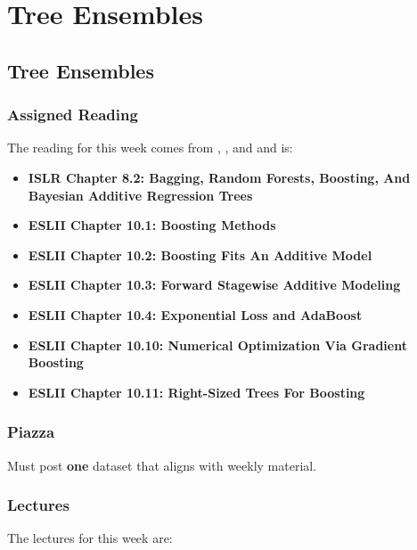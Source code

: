 \clearpage

\renewcommand{\ChapTitle}{Tree Ensembles}
\renewcommand{\SectionTitle}{Tree Ensembles}

\chapter{\ChapTitle}
\section{\SectionTitle}

\subsection{Assigned Reading}

The reading for this week comes from \ISLRPython, \ISLRR, and \ESLII \hspace*{1pt} and is:

\begin{itemize}
    \item \textbf{ISLR Chapter 8.2: Bagging, Random Forests, Boosting, And Bayesian Additive Regression Trees}
    \item \textbf{ESLII Chapter 10.1: Boosting Methods}
    \item \textbf{ESLII Chapter 10.2: Boosting Fits An Additive Model}
    \item \textbf{ESLII Chapter 10.3: Forward Stagewise Additive Modeling}
    \item \textbf{ESLII Chapter 10.4: Exponential Loss and AdaBoost}
    \item \textbf{ESLII Chapter 10.10: Numerical Optimization Via Gradient Boosting}
    \item \textbf{ESLII Chapter 10.11: Right-Sized Trees For Boosting}
\end{itemize}

\subsection{Piazza}

Must post \textbf{one} dataset that aligns with weekly material.

\subsection{Lectures}

The lectures for this week are:

